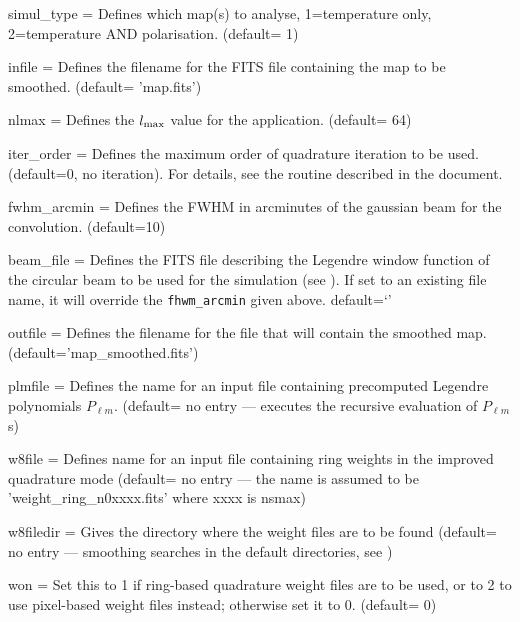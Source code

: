 \begin{qualifiers}
  \begin{qulist}{} %
     \item[{simul\_type = }]%
 Defines which map(s) to analyse, 1=temperature only, 2=temperature AND polarisation.
(default= 1)
    \item[{infile = }]%
 Defines the filename for the FITS file containing the map to be smoothed. 
	(default= 'map.fits')
    \item[{nlmax = }]%
 Defines the $l_{\mathrm{max}}$ value for the application.
(default= 64)
    \item[{iter\_order = }]%
 Defines the maximum order of quadrature 
      iteration to be used. (default=0, no iteration).
For details, see the  routine
described in the  document.
 \item[{fwhm\_arcmin = }]%
 Defines the FWHM in arcminutes of the gaussian 
beam for the convolution. (default=10)
    \item[{beam\_file = }] Defines the FITS file describing the
    Legendre window
    function of the circular beam to be used for the
    simulation (see ). 
    If set to an existing file name, it will override the
    {\tt fhwm\_arcmin} given above. default=`'
\item[{outfile = }]%
 Defines the filename for the file that will contain 
the smoothed map. (default='map\_smoothed.fits')
     \item[{plmfile = }] Defines the name for an input file
    containing  precomputed Legendre polynomials $P_{\ell m}$.
(default= no entry --- \thedocid executes the recursive evaluation 
of $P_{\ell m}$s)
\item[{w8file = }]%
 Defines name for an input file containing ring
  weights in the improved quadrature mode (default= no entry ---
the name is assumed to be 'weight\_ring\_n0xxxx.fits' where xxxx is nsmax)
\item[{w8filedir = }]%
 Gives the directory where the weight files are
to be found (default= no entry --- smoothing searches in the default
directories, see )
\item[{won = }]%
 Set this to 1 if ring-based quadrature weight files are to be used,
 or to 2 to use pixel-based weight files instead;
otherwise set it to 0. (default= 0)
  \end{qulist}
\end{qualifiers}

